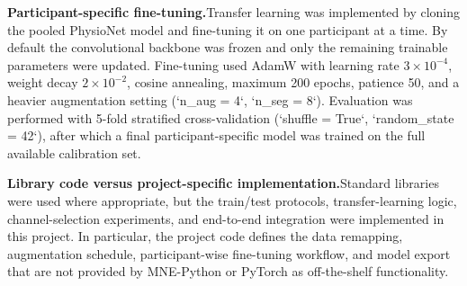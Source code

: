 \documentclass[12pt, a4paper]{article}
\begin{document}
\textbf{Participant-specific fine-tuning.}\quad Transfer learning was implemented by cloning the pooled PhysioNet model and fine-tuning it on one participant at a time. By default the convolutional backbone was frozen and only the remaining trainable parameters were updated. Fine-tuning used AdamW with learning rate $3 \times 10^{-4}$, weight decay $2 \times 10^{-2}$, cosine annealing, maximum 200 epochs, patience 50, and a heavier augmentation setting (`n\_aug = 4`, `n\_seg = 8`). Evaluation was performed with 5-fold stratified cross-validation (`shuffle = True`, `random\_state = 42`), after which a final participant-specific model was trained on the full available calibration set.

\textbf{Library code versus project-specific implementation.}\quad Standard libraries were used where appropriate, but the train/test protocols, transfer-learning logic, channel-selection experiments, and end-to-end integration were implemented in this project. In particular, the project code defines the data remapping, augmentation schedule, participant-wise fine-tuning workflow, and model export that are not provided by MNE-Python or PyTorch as off-the-shelf functionality.
\end{document}
